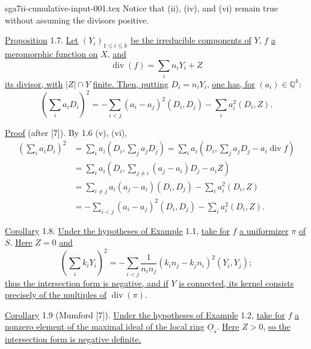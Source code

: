 \begin{filecontents*}{sga7ii-cumulative-input-001.tex}
Notice that (ii), (iv), and (vi) remain true without assuming the divisors positive.


\underline{Proposition} 1.7. \underline{Let} $(Y_i)_{1\leq i\leq k}$
\underline{be the irreducible components of} $Y$, $f$ \underline{a meromorphic
function on} $X$, \underline{and}
\begin{equation*}
\operatorname{div}(f)=\sum_i n_iY_i+Z
\end{equation*}
\underline{its divisor, with} $|Z|\cap Y$ \underline{finite. Then, putting}
$D_i=n_iY_i$, \underline{one has, for} $(a_i)\in\mathbb Q^k$:
\begin{equation*}
\left(\sum_i a_iD_i\right)^2
=-\sum_{i<j}(a_i-a_j)^2(D_i,D_j)-\sum_i a_i^2(D_i,Z).
\end{equation*}

\underline{Proof} (after [7]). By 1.6 (v), (vi),
\begin{equation*}
\begin{aligned}
\left(\sum_i a_iD_i\right)^2
&=\sum_i a_i\left(D_i,\sum_j a_jD_j\right)
=\sum_i a_i\left(D_i,\sum_j a_jD_j-a_i\operatorname{div}f\right)\\
&=\sum_i a_i\left(D_i,\sum_{j\ne i}(a_j-a_i)D_j-a_iZ\right)\\
&=\sum_{i\ne j}a_i(a_j-a_i)(D_i,D_j)-\sum_i a_i^2(D_i,Z)\\
&=-\sum_{i<j}(a_i-a_j)^2(D_i,D_j)-\sum_i a_i^2(D_i,Z).
\end{aligned}
\end{equation*}

\underline{Corollary} 1.8. \underline{Under the hypotheses of Example} 1.1,
\underline{take for} $f$ \underline{a uniformizer} $\pi$ \underline{of} $S$.
\underline{Here} $Z=0$ \underline{and}
\begin{equation*}
\left(\sum_i k_iY_i\right)^2
=-\sum_{i<j}\frac{1}{n_in_j}(k_in_j-k_jn_i)^2(Y_i,Y_j);
\end{equation*}
\underline{thus the intersection form is negative, and if} $Y$
\underline{is connected, its kernel consists precisely of the multiples of}
$\operatorname{div}(\pi)$.

\underline{Corollary} 1.9 (Mumford [7]). \underline{Under the hypotheses of Example}
1.2, \underline{take for} $f$ \underline{a nonzero element of the maximal ideal of
the local ring} $\underline O_s$. \underline{Here} $Z>0$, \underline{so the
intersection form is negative definite.}
\end{filecontents*}
